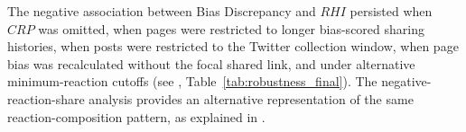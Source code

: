 The negative association between Bias Discrepancy and $RHI$ persisted
when $CRP$ was omitted, when pages were restricted to longer bias-scored
sharing histories, when posts were restricted to the Twitter collection
window, when page bias was recalculated without the focal shared link,
and under alternative minimum-reaction cutoffs (see
, Table~\ref{tab:robustness_final}).
The negative-reaction-share analysis provides an alternative representation
of the same reaction-composition pattern, as explained in
.
